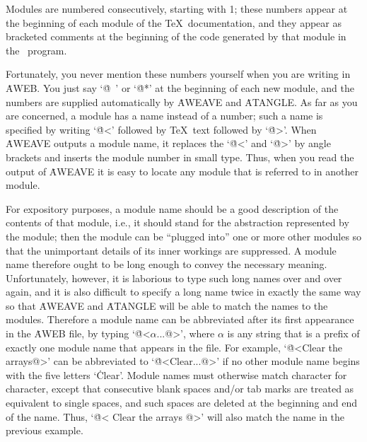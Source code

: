 Modules are numbered consecutively, starting with 1; these numbers appear
at the beginning of each module of the \TeX\ documentation, and they appear
as bracketed comments at the beginning of the code generated by that
module in the \ADA\ program.
 
Fortunately, you never mention these numbers yourself when you are writing
in \.{AWEB}. You just say `\.{@\ }' or `\.{@*}' at the beginning of each
new module, and the numbers are supplied automatically by \.{AWEAVE} and
\.{ATANGLE}. As far as you are concerned, a module has a
name instead of a number; such a name is specified by writing
`\.{@<}' followed by \TeX\ text followed by `\.{@>}'. When \.{AWEAVE}
outputs a module name, it replaces the `\.{@<}' and `\.{@>}' by
angle brackets and inserts the module number in small type. Thus, when you
read the output of \.{AWEAVE} it is easy to locate any module that is
referred to in another module.
 
For expository purposes, a module name should be a good description of the
contents of that module, i.e., it should stand for the abstraction
represented by the module; then the module can be ``plugged into'' one or
more other modules so that the unimportant details of its inner workings
are suppressed.  A module name therefore ought to be long enough to convey
the necessary meaning. Unfortunately, however, it is laborious to type
such long names over and over again, and it is also difficult to specify a
long name twice in exactly the same way so that \.{AWEAVE} and \.{ATANGLE}
will be able to match the names to the modules. Therefore a module name
can be abbreviated after its first appearance in the \.{AWEB} file, by
typing `\.{@<$\alpha$...@>}', where $\alpha$ is any string that is a prefix of
exactly one module name that appears in the file. For example, `\.{@<Clear
the arrays@>}' can be abbreviated to `\.{@<Clear...@>}' if no other module
name begins with the five letters `\.{Clear}'. Module names must otherwise
match character for character, except that consecutive blank spaces and/or
tab marks are treated as equivalent to single spaces, and such spaces are
deleted at the beginning and end of the name. Thus, `\.{@< Clear { }the
arrays @>}' will also match the name in the previous example.
 
